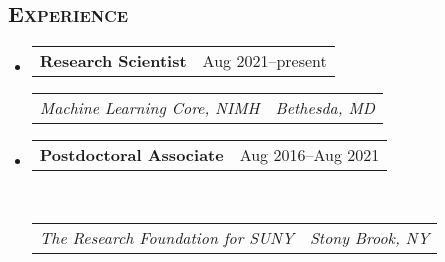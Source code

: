 \documentclass[11pt]{article}
\makeatletter
\newcommand{\headerrow}[2]
{\begin{tabular*}{\linewidth}{l@{\extracolsep{\fill}}r}
	#1 &
	#2 \\
\end{tabular*}}
\makeatother
\begin{document}
\subsection*{\textsc{Experience}}
\begin{itemize}
    \parskip=0.1em
    \item
    \headerrow
    {\textbf{Research Scientist}}
    {{Aug 2021--present}}
    \headerrow
    {\emph{Machine Learning Core, NIMH}} 
    {\emph{Bethesda, MD}}
    {}
    \item
    \headerrow
    {\textbf{Postdoctoral Associate}}
    {{Aug 2016--Aug 2021}}
    \\
    \headerrow
    {\emph{The Research Foundation for SUNY}}
    {\emph{Stony Brook, NY}}
    {}
\end{itemize}
\end{document}

